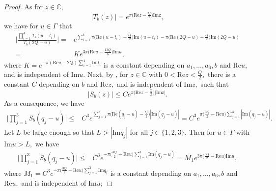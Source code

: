 \documentclass[11pt]{article}
\theoremstyle{remark}
\theoremstyle{remark}
\numberwithin{equation}{section}
\begin{document}
\begin{proof}
As for $z\in\mathbb C,$ 
\begin{equation}\label{Tbnorm}
    |T_b(z)|=e^{\pi \big(\mathrm{Re}z -\frac{Q}{2}\big)\mathrm{Imz}},
\end{equation}
we have for $u\in \Gamma$ that 
\begin{equation}\label{Test}
\begin{split}
\Bigg|\frac{\prod_{i=1}^4 T_b(u-t_i)}{T_b(2Q-u)}\Bigg| = & e^{\sum_{i=1}^4\pi \big(\mathrm{Re}(u-t_i)-\frac{Q}{2}\big)\mathrm{Im}(u-t_i)-\pi\big(\mathrm{Re}(2Q-u)-\frac{Q}{2}\big)\mathrm{Im}(2Q-u)}\\
= & K e^{3\pi \big(\mathrm{Re}u-\frac{13Q}{6}\big)\mathrm{Im}u},
\end{split}
\end{equation}
where $K=e^{-\pi (\mathrm{Re}u-2Q)\sum_{i=1}^4\mathrm{Im}t_i}$ is a constant depending on $a_1,\dots, a_6, b$  and $\mathrm{Re}u,$ and is independent of $\mathrm{Im}u.$ Next, by \cite[Formula (2.20)]{LMSWY}, for $z\in \mathbb C$ with $0<\mathrm{Re}z <\frac{Q}{2},$ there is a constant $C$ depending on $b$ and $\mathrm{Re}z,$ and is independent of $\mathrm{Im}z,$ such that 
\begin{equation}\label{Sbbound}
|S_b(z)|\leqslant Ce^{\pi \big(\mathrm{Re}z -\frac{Q}{2}\big)|\mathrm{Imz}|}.
\end{equation}
As a consequence, we have 
\begin{equation*}
\begin{split}
\Bigg|\prod_{j=1}^3 S_b(q_j-u)\Bigg| \leqslant & C^3e^{\sum_{j=1}^3\pi \big(\mathrm{Re}(q_j-u)-\frac{Q}{2}\big)|\mathrm{Im}(q_j-u)|}= C^3e^{\pi \big(\frac{3Q}{2}-\mathrm{Re}u\big)\sum_{j=1}^3|\mathrm{Im}(q_j-u)|}.
\end{split}
\end{equation*}
Let $L$ be large enough so that $L>|\mathrm{Im}q_j|$ for all $j\in\{1,2,3\}.$ Then for $u\in\Gamma$ with $\mathrm{Im}u >L,$ we have 
\begin{equation}\label{Sest+}
\begin{split}
\Bigg|\prod_{j=1}^3 S_b(q_j-u)\Bigg| \leqslant &  C^3e^{-\pi \big(\frac{3Q}{2}-\mathrm{Re}u\big)\sum_{j=1}^3\mathrm{Im}(q_j-u)}=M_1e^{3\pi \big(\frac{3Q}{2}-\mathrm{Re}u\big)\mathrm{Im}u},
\end{split}
\end{equation}
where $M_1=C^3e^{-\pi\big(\frac{3Q}{2}-\mathrm{Re}u\big)\sum_{j=1}^3\mathrm{Im}q_j}$  is a constant depending on $a_1,\dots, a_6, b$  and $\mathrm{Re}u,$ and is independent of $\mathrm{Im}u;$

\end{proof}
\end{document}
